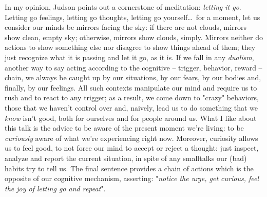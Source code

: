 In my opinion, Judson points out a cornerstone of meditation:
\emph{letting it go}.  Letting go feelings, letting go thoughts,
letting go yourself\ldots\, for a moment, let us consider our minds be
mirrors facing the sky: if there are not clouds, mirrors show clean,
empty sky; otherwise, mirrors show clouds, simply. Mirrors neither do
actions to show something else nor disagree to show things ahead of
them; they just recognize what it is passing and let it go, as it
is. If we fall in any \emph{dualism}, another way to say acting
according to the cognitive -- trigger, behavior, reward -- chain, we
always be caught up by our situations, by our fears, by our bodies
and, finally, by our feelings.  All such contexts manipulate our mind
and require us to rush and to react to any trigger; as a result, we
come down to "crazy" behaviors, those that we haven't control over
and, naively, lead us to do something that we \emph{know} isn't good,
both for ourselves and for people around us.  What I like about this
talk is the advice to be aware of the present moment we're living: to
be \emph{curiously} aware of what we're experiencing right
now. Moreover, curiosity allows us to feel good, to not force our mind
to accept or reject a thought: just inspect, analyze and report the
current situation, in spite of any smalltalks our (bad) habits try to
tell us.  The final sentence provides a chain of actions which is the
opposite of our cognitive mechanism, asserting: "\emph{notice the
  urge, get curious, feel the joy of letting go and repeat}".

